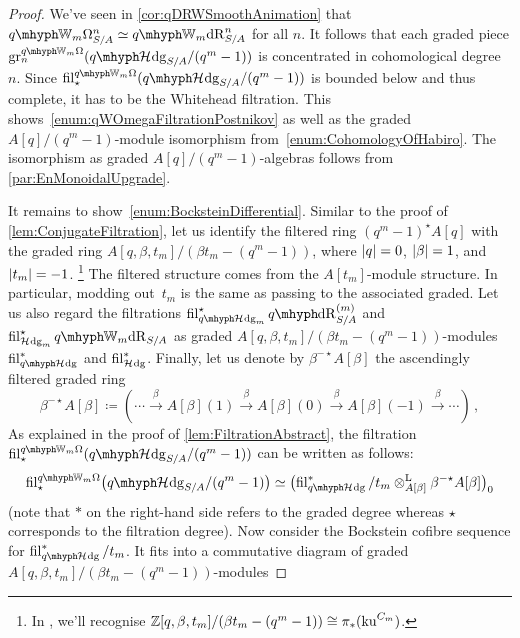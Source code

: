 \documentclass[DIV=12,numbers=enddot,leqno,bibliography=totoc]{scrartcl}
\begin{document}
	\begin{proof}
		We've seen in \cref{cor:qDRWSmoothAnimation} that $\qIW_m\Omega_{S/A}^n\simeq \qIW_m\deRham_{S/A}^n$ for all $n$. It follows that each graded piece $\gr_n^{\qIW_m\Omega}(\qHhodge_{S/A}/(q^m-1))$ is concentrated in cohomological degree~$n$. Since $ \fil_\star^{\qIW_m\Omega}(\qHhodge_{S/A}/(q^m-1))$ is bounded below and thus complete, it has to be the Whitehead filtration. This shows~\cref{enum:qWOmegaFiltrationPostnikov} as well as the graded $A[q]/(q^m-1)$-module isomorphism from~\cref{enum:CohomologyOfHabiro}.  The isomorphism as graded $A[q]/(q^m-1)$-algebras follows from \cref{par:EnMonoidalUpgrade}.
		
		It remains to show~\cref{enum:BocksteinDifferential}. Similar to the proof of \cref{lem:ConjugateFiltration}, let us identify the filtered ring $(q^m-1)^\star A[q]$ with the graded ring $A[q,\beta,t_m]/(\beta t_m-(q^m-1))$, where $\lvert q\rvert=0$, $\lvert\beta\rvert=1$, and $\lvert t_m\rvert=-1$.%
		\footnote{In \cite{qdeRhamku}, we'll recognise $\mathbb{Z}[q,\beta,t_m]/(\beta t_m-(q^m-1))\cong \pi_*(\mathrm{ku}^{C_m})$.}
		The filtered structure comes from the $A[t_m]$-module structure. In particular, modding out~$t_m$ is the same as passing to the associated graded. Let us also regard the filtrations $ \fil_{\qHhodge_m}^\star\qdeRham_{S/A}^{(m)}$ and $ \fil_{\Hhodge_m}^\star\qIW_m\deRham_{S/A}$ as graded $A[q,\beta,t_m]/(\beta t_m-(q^m-1))$-modules $ \fil_{\qHhodge}^*$ and $ \operatorname{fil}_{\mathcal{H}_{}\mathrm{dg}}^*$. Finally, let us denote by $\beta^{-\star} A[\beta]$ the ascendingly filtered graded ring
		\begin{equation*}
			\beta^{-\star}A[\beta]\coloneqq \left(\dotsb\overset{\beta}{\longrightarrow}A[\beta](1)\overset{\beta}{\longrightarrow}A[\beta](0)\overset{\beta}{\longrightarrow}A[\beta](-1)\overset{\beta}{\longrightarrow}\dotsb\right)\,,
		\end{equation*}
		As explained in the proof of \cref{lem:FiltrationAbstract}, the filtration $ \fil_\star^{\qIW_m\Omega}(\qHhodge_{S/A}/(q^m-1))$ can be written as follows:
		\begin{equation*}
			\fil_\star^{\qIW_m\Omega}\bigl(\qHhodge_{S/A}/(q^m-1)\bigr)\simeq \bigl( \fil_{\qHhodge}^*/t_m\lotimes_{A[\beta]}\beta^{-\star}A[\beta]\bigr)_0
		\end{equation*}
		(note that $*$ on the right-hand side refers to the graded degree whereas $\star$ corresponds to the filtration degree). Now consider the Bockstein cofibre sequence for $ \fil_{\qHhodge}^*/t_m$. It fits into a commutative diagram of graded $A[q,\beta,t_m]/(\beta t_m-(q^m-1))$-modules

\end{proof}
\end{document}

